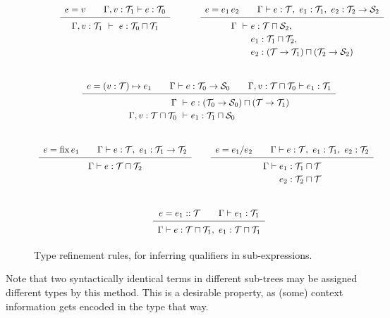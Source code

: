 \begin{figure*}
\newcommand\typerule[2]{{\renewcommand\arraystretch{1.5}\begin{array}[t]{c} #1 \\ \hline #2 \end{array}}}
\[
\renewcommand\arraystretch{4}
\begin{array}{cc}
  \typerule{e=v \qquad \Gamma,v:\T_1\vdash e:\T_0}
           {\Gamma,v:\T_1 ~\vdash~ e:\T_0\sqcap\T_1} &
  \typerule{e=e_1\,e_2 \qquad \Gamma \vdash e:\T, ~ e_1:\T_1, ~ e_2:\T_2\to\S_2}
           {\renewcommand\arraystretch{1.2}
            \begin{array}[t]{@{}l@{}l@{}}
              \Gamma ~\vdash~ & e:\T\sqcap\S_2, \\ 
                              & e_1:\T_1\sqcap\T_2, \\
                              & e_2:(\T\to\T_1)\sqcap(\T_2\to\S_2)
            \end{array}} \\
  \cspan2{
  \typerule{e=(v:\T)\mapsto e_1 \qquad \Gamma\vdash e:\T_0\to\S_0 \qquad \Gamma,v:\T\sqcap\T_0\vdash e_1:\T_1}
           {\renewcommand\arraystretch{1.2}
            \begin{array}[t]{r@{}l}
              \Gamma ~\vdash~ & e:(\T_0\to\S_0)\sqcap(\T\to\T_1)\\
              \Gamma,v:\T\sqcap\T_0 ~\vdash~ & e_1:\T_1\sqcap\S_0 
            \end{array}}  } \\
  \typerule{e=\fix e_1 \qquad \Gamma\vdash e:\T, ~ e_1:\T_1\to\T_2}          %
           {\Gamma\vdash e: \T\sqcap\T_2} &
  \typerule{e=e_1/e_2 \qquad \Gamma\vdash e:\T, ~ e_1:\T_1, ~ e_2:\T_2}      %
           {\renewcommand\arraystretch{1.2}
            \begin{array}[t]{@{}l@{}l@{}}
              \Gamma\vdash{} & e_1:\T_1\sqcap\T \\ & 
                               e_2:\T_2\sqcap\T
            \end{array}} \\
  \cspan2{
  \typerule{e=e_1::\T \qquad \Gamma\vdash e_1:\T_1}
           {\Gamma\vdash e:\T\sqcap\T_1, ~ e_1:\T\sqcap\T_1} }
\end{array}
\]
\caption{\label{lang:type refinement rules}
  Type refinement rules, for inferring qualifiers in sub-expressions.}
\end{figure*}

Note that two syntactically identical terms in different sub-trees may be assigned
different types by this method. This is a desirable property, as (some) context information
gets encoded in the type that way.

